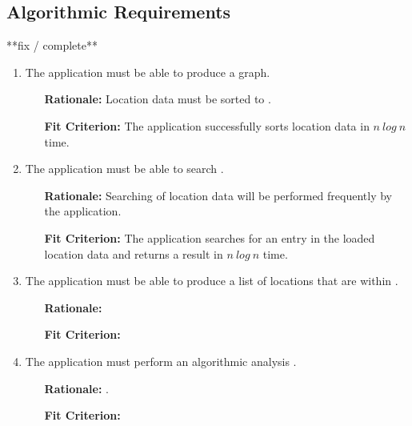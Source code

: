 \documentclass[english]{article}
\begin{document}
\subsection{Algorithmic Requirements}
**fix / complete**

\begin{enumerate}[\bf{FAR}1.]

    \item The application must be able to produce a graph.
	\begin{enumerate}[leftmargin=1cm]
        \item [{\bf Rationale:}] Location data must be sorted to .
        \item [{\bf Fit Criterion:}] The application successfully sorts location data in $n~log~n$ time.
	\end{enumerate}

	\item The application must be able to search .
	\begin{enumerate}[leftmargin=1cm]
        \item [{\bf Rationale:}] Searching of location data will be performed frequently by the application.
        \item [{\bf Fit Criterion:}] The application searches for an entry in the loaded location data and returns a result in $n~log~n$ time.
	\end{enumerate}

    \item The application must be able to produce a list of locations that are within .
	\begin{enumerate}[leftmargin=1cm]
        \item [{\bf Rationale:}]
        \item [{\bf Fit Criterion:}]
	\end{enumerate}

    \item The application must perform an algorithmic analysis .
	\begin{enumerate}[leftmargin=1cm]
        \item [{\bf Rationale:}] .
        \item [{\bf Fit Criterion:}]
	\end{enumerate}

	

\end{enumerate}
\end{document}
